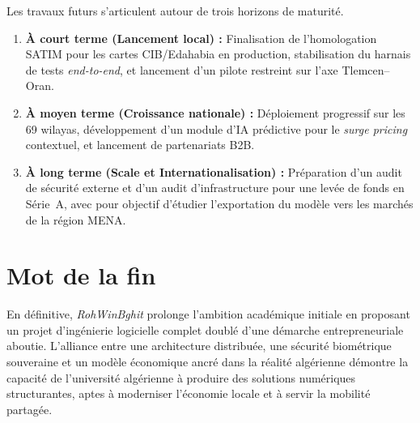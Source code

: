 Les travaux futurs s'articulent autour de trois horizons de maturité.
\begin{enumerate}
  \item \textbf{À court terme (Lancement local) :} Finalisation de l'homologation SATIM pour les cartes CIB/Edahabia en production, stabilisation du harnais de tests \textit{end-to-end}, et lancement d'un pilote restreint sur l'axe Tlemcen--Oran.
  \item \textbf{À moyen terme (Croissance nationale) :} Déploiement progressif sur les 69 wilayas, développement d'un module d'IA prédictive pour le \textit{surge pricing} contextuel, et lancement de partenariats B2B.
  \item \textbf{À long terme (Scale et Internationalisation) :} Préparation d'un audit de sécurité externe et d'un audit d'infrastructure pour une levée de fonds en Série~A, avec pour objectif d'étudier l'exportation du modèle vers les marchés de la région MENA.
\end{enumerate}

\section*{Mot de la fin}

En définitive, \textit{RohWinBghit} prolonge l'ambition académique initiale en proposant un projet d'ingénierie logicielle complet doublé d'une démarche entrepreneuriale aboutie. L'alliance entre une architecture distribuée, une sécurité biométrique souveraine et un modèle économique ancré dans la réalité algérienne démontre la capacité de l'université algérienne à produire des solutions numériques structurantes, aptes à moderniser l'économie locale et à servir la mobilité partagée.
